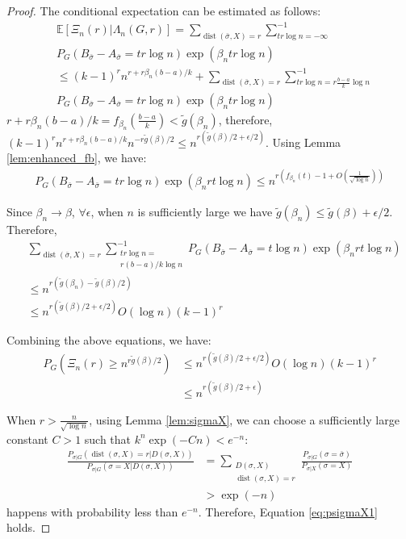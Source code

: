 \documentclass[entropy,article,accept,moreauthors,pdftex]{Definitions/mdpi}
\newcommand{\1}{\mathbbm{1}}
\DeclareMathOperator{\Dist}{dist}
\begin{document}
\begin{paracol}{2}
\begin{proof}
The conditional expectation can be estimated as follows:
\begin{align*}
&\mathbb{E}[\Xi_n(r)|\Lambda_n(G,r)]=
\sum_{\Dist(\bar{\sigma}, X) = r}\sum_{tr\log n = -\infty }^{-1} \\
& P_G(B_{\bar{\sigma}} -A_{\bar{\sigma}}=tr\log n)\exp(\beta_n tr \log n) \\
& \leq (k-1)^r n^{r+r\beta_n(b-a)/k} +
\sum_{\Dist(\bar{\sigma}, X) = r}\sum_{tr\log n = r\frac{b-a}{k}\log n }^{-1} \\
& P_G(B_{\bar{\sigma}} -A_{\bar{\sigma}}=tr\log n)\exp(\beta_n tr \log n)
\end{align*}
$r+r\beta_n(b-a)/k = f_{\beta_n}(\frac{b-a}{k}) < \tilde{g}(\beta_n)$, therefore,
$(k-1)^r n^{r+r\beta_n (b-a)/k}n^{-r \tilde{g}(\beta) /2} \leq$\linebreak $n^{r (\tilde{g}(\beta) /2 + \epsilon/2)} $.
Using Lemma \ref{lem:enhanced_fb}, we have:
\begin{align*}
P_G(B_{\bar{\sigma}} -A_{\bar{\sigma}}=tr\log n)\exp(\beta_n rt \log n) \leq 
n^{r(f_{\beta_n}(t)-1 + O(\frac{1}{\sqrt{\log n}}))}
\end{align*}

Since $\beta_n \to \beta$, $\forall \epsilon$, when $n$ is sufficiently large
we have $\tilde{g}(\beta_n) \leq \tilde{g}(\beta) + \epsilon /2$.
Therefore,
\begin{align*}
&\sum_{\Dist(\bar{\sigma}, X) = r}\sum_{\substack{tr\log n = \\ r(b-a)/k\log n} }^{-1}
P_G(B_{\bar{\sigma}} -A_{\bar{\sigma}}=t\log n)\exp(\beta_n rt \log n) \\
& \leq  n^{r(\tilde{g}(\beta_n) - \tilde{g}(\beta)/2)}\\
& \leq  n^{r(\tilde{g}(\beta)/2 + \epsilon/2)} O(\log n) (k-1)^r
\end{align*}

Combining the above equations, we have:
\begin{align*}
P_{G}(\Xi_n(r) \geq n^{r \tilde{g}(\beta) /2}) &\leq  n^{r(\tilde{g}(\beta)/2 + \epsilon/2)} O(\log n) (k-1)^r\\
&\leq n^{r(\tilde{g}(\beta)/2 + \epsilon)}
\end{align*}

When $r>\frac{n}{\sqrt{\log n}}$, using Lemma \ref{lem:sigmaX}, we can choose a sufficiently large constant $C>1$
such that $k^n\exp(-Cn) < e^{-n}$:
\begin{align*}
\frac{P_{\sigma|G}(\Dist(\sigma, X)=r | D(\sigma, X))}
{P_{\sigma|G}(\sigma=X | D(\sigma, X))} &= \sum_{\substack{D(\sigma, X) \\ \Dist(\sigma, X)=r}} \frac{P_{\sigma | G}(\sigma = \bar{\sigma}) }{P_{\sigma | X}(\sigma = X)} \\
&> \exp(-n)
\end{align*}
happens with probability less than $e^{-n}$. Therefore,  Equation \eqref{eq:psigmaX1} holds.
\end{proof}


\end{paracol}
\end{document}
